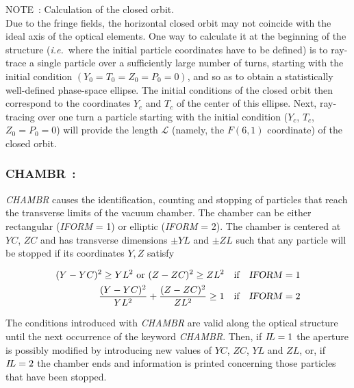\noindent NOTE~: Calculation of the closed orbit. \\
Due to the fringe fields, the horizontal closed orbit may not 
coincide with the ideal axis of the optical elements. One way to 
calculate it at the beginning of the structure (\emph{i.e.}\ where the 
initial particle coordinates have to be defined) is to ray-trace 
a single particle over a sufficiently large number of turns, 
starting with the initial condition $ (Y_0=T_0=Z_0=P_0=0)$,  and so as to 
obtain a statistically well-defined phase-space ellipse. The 
initial conditions of the closed orbit then correspond to the 
coordinates $ Y_c $ and $ T_c $ of the center of this ellipse. Next, 
ray-tracing over one turn a particle starting with the initial condition 
($Y_c $, $ T_c $, $ Z_0=P_0=0$)  will provide the length $\mathcal{L}$ 
(namely, the $ F(6,1) $ coordinate) of the closed orbit. 

\newpage

\subsubsection*{CHAMBR~:  \CHAMBRTitl}\label{CHAMBR} 
\medskip

\textsl{CHAMBR} causes the identification, counting and stopping of 
particles that reach the 
transverse limits of the vacuum chamber.  The chamber can be either rectangular 
(\textsl{IFORM} = 1) or elliptic (\textsl{IFORM} = 2). The chamber is centered
at $ YC$, $ZC $ and has transverse dimensions $\pm YL $ and  
$\pm  ZL $ such that any particle will be stopped if its coordinates $ Y,Z $ satisfy 

\begin{align*}
	(Y-YC)^2\geq  YL^2  \text{ or }   (Z-ZC)^2 \geq  ZL^2 
	   &   \quad \text{if}\quad  \text{\textsl{IFORM}}=1  \\
	\dfrac{ (Y-YC)^2 }{ YL^2} + \dfrac{(Z-ZC)^2 }{ ZL^2} \geq 1  
	  &   \quad \text{if}\quad  \text{\textsl{IFORM}}=2  
\end{align*}

\noindent The conditions introduced with \textsl{CHAMBR} are valid
along  the optical structure until the next occurrence  of the keyword \textsl{CHAMBR}.  Then, if
$ I\!L=1 $ the aperture is possibly modified by introducing new values of $ YC$,  $ ZC$, 
 $YL $ and $ ZL $, or, if $ I\!L=2 $ the chamber ends and information is 
printed concerning those particles that have been stopped.  
\bigskip

